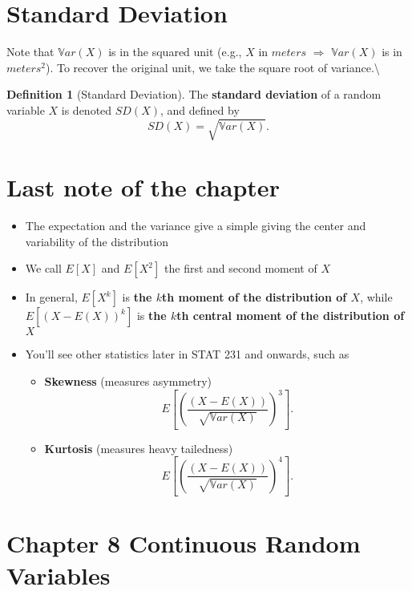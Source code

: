 \documentclass[
]{book}
\theoremstyle{definition}
\newtheorem{definition}{Definition}[chapter]
\theoremstyle{definition}
\theoremstyle{definition}
\theoremstyle{definition}
\theoremstyle{remark}
\begin{document}
\section{Standard Deviation}\label{standard-deviation}

Note that \(\mathbb{V}ar(X)\) is in the squared unit (e.g., \(X\) in \(meters\) \(\Rightarrow\) \(\mathbb{V}ar(X)\) is in \(meters^2\)). To recover the original unit, we take the square root of variance.\textbackslash{}

\begin{definition}[Standard Deviation]
The \textbf{standard deviation} of a random variable \(X\) is denoted \(SD(X)\), and defined by
\[
SD(X) = \sqrt{\mathbb{V}ar(X)}.
\]
\end{definition}

\section{Last note of the chapter}\label{last-note-of-the-chapter}

\begin{itemize}
\item
  The expectation and the variance give a simple  giving the center and variability of the distribution
\item
  We call \(E[X]\) and \(E[X^2]\) the first and second moment of \(X\)
\item
  In general, \(E[X^k]\) is \textbf{the \(k\)th moment of the distribution of \(X\)}, while \(E[ (X-E(X))^k]\) is \textbf{the \(k\)th central moment of the distribution of \(X\)}
\item
  You'll see other statistics later in STAT 231 and onwards, such as

  \begin{itemize}
  \item
    \textbf{Skewness} (measures asymmetry)
    \[
    E\left[\left( \frac{(X - E(X))}{\sqrt{\mathbb{V}ar(X)}} \right)^3\right].
    \]
  \item
    \textbf{Kurtosis} (measures heavy tailedness)
    \[
    E\left[\left( \frac{(X - E(X))}{\sqrt{\mathbb{V}ar(X)}} \right)^4\right].
    \]
  \end{itemize}
\end{itemize}

\section{Chapter 8 Continuous Random Variables}\label{chapter-8-continuous-random-variables}
\end{document}
